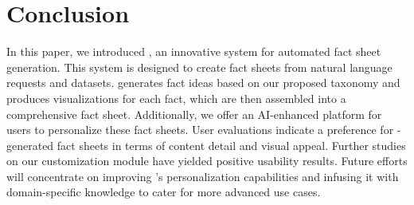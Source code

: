 \section{Conclusion}

In this paper, we introduced \tool, an innovative system for automated fact sheet generation. This system is designed to create fact sheets from natural language requests and datasets. \tool generates fact ideas based on our proposed taxonomy and produces visualizations for each fact, which are then assembled into a comprehensive fact sheet. Additionally, we offer an AI-enhanced platform for users to personalize these fact sheets. User evaluations indicate a preference for \tool-generated fact sheets in terms of content detail and visual appeal. Further studies on our customization module have yielded positive usability results. Future efforts will concentrate on improving \tool's personalization capabilities and infusing it with domain-specific knowledge to cater for more advanced use cases.

